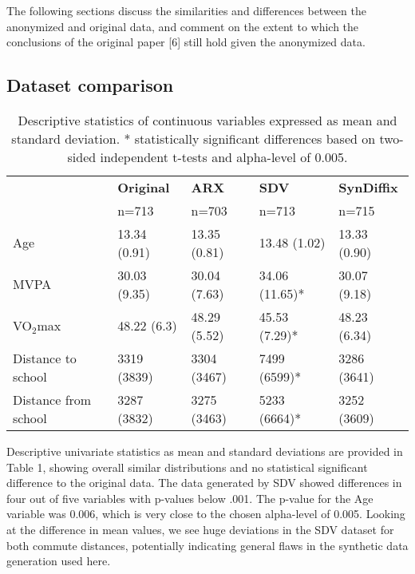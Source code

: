 \documentclass[10pt]{article}
\newcommand{\mycite}[1]{[#1]}
\begin{document}
The following sections discuss the similarities and differences between the anonymized and original data, and comment on the extent to which the conclusions of the original paper \mycite{6} still hold given the anonymized data.

\subsection*{Dataset comparison}

\setlength{\fboxsep}{0pt}
\begin{table}
      \begin{center}
      \begin{small}
\begin{tabular}{lllll}
\toprule
 & \textbf{Original}  & \textbf{ARX} & \textbf{SDV} & \textbf{SynDiffix} \\
 & n=713 & n=703  & n=713  & n=715   \\
\midrule
Age & 13.34 (0.91) & 13.35 (0.81)  & 13.48 (1.02)  & 13.33 (0.90) \\
MVPA & 30.03 (9.35) & 30.04 (7.63) & 34.06 (11.65)* & 30.07 (9.18) \\
VO$_2$max & 48.22 (6.3) & 48.29 (5.52)  & 45.53 (7.29)*  & 48.23 (6.34) \\
Distance to school & 3319 (3839) & 3304 (3467) & 7499 (6599)* & 3286 (3641) \\
Distance from school & 3287 (3832) & 3275 (3463) & 5233 (6664)* & 3252 (3609) \\
\bottomrule
\end{tabular}
      \end{small}
      \caption{Descriptive statistics of continuous variables expressed as mean and standard deviation. * statistically significant differences based on two-sided independent t-tests and alpha-level of 0.005.}
      \label{tab:table1}
      \end{center}
      \end{table}
	\setlength{\fboxsep}{3pt}

Descriptive univariate statistics as mean and standard deviations are provided in Table 1, showing overall similar distributions and no statistical significant difference to the original data. The data generated by SDV showed differences in four out of five variables with p-values below .001. The p-value for the Age variable was 0.006, which is very close to the chosen alpha-level of 0.005. Looking at the difference in mean values, we see huge deviations in the SDV dataset for both commute distances, potentially indicating general flaws in the synthetic data generation used here.
\end{document}
